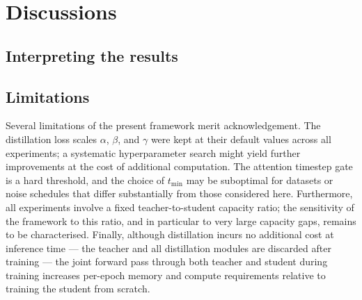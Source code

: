 




















































\section{Discussions}
\label{sec:disc_limits}

\subsection{Interpreting the results}
\label{subsec:interp-results}


\subsection{Limitations}
\label{subsec:limits}
Several limitations of the present framework merit acknowledgement. The
distillation loss scales $\alpha$, $\beta$, and $\gamma$ were kept at their
default values across all experiments; a systematic hyperparameter search
might yield further improvements at the cost of additional computation. The
attention timestep gate is a hard threshold, and the choice of $t_{\min}$
may be suboptimal for datasets or noise schedules that differ substantially
from those considered here. Furthermore, all experiments involve a fixed
teacher-to-student capacity ratio; the sensitivity of the framework to this
ratio, and in particular to very large capacity gaps, remains to be
characterised. Finally, although distillation incurs no additional cost at
inference time — the teacher and all distillation modules are discarded after
training — the joint forward pass through both teacher and student during
training increases per-epoch memory and compute requirements relative to
training the student from scratch.